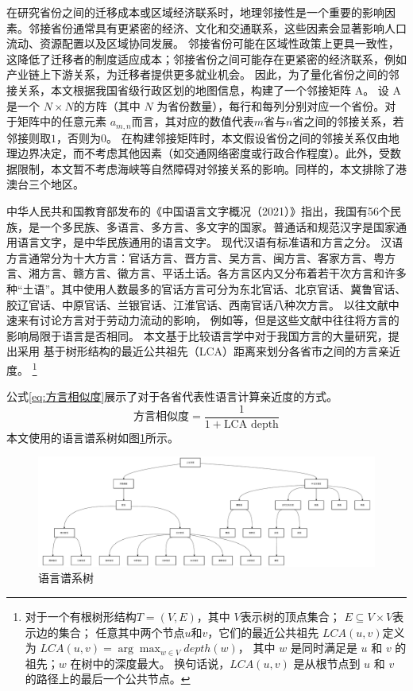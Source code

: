\documentclass[
  a4paper,
  zihao=-4,
  fontset=mac,
  AutoFakeBold,
  AutoFakeSlant,
  oneside]{ctexbook}
\let\oldfootnote\footnote
\renewcommand{\footnote}[1]{%
  \oldfootnote{\setstretch{1.5}#1}%
}
\begin{document}
在研究省份之间的迁移成本或区域经济联系时，地理邻接性是一个重要的影响因素。邻接省份通常具有更紧密的经济、文化和交通联系，这些因素会显著影响人口流动、资源配置以及区域协同发展。
邻接省份可能在区域性政策上更具一致性，这降低了迁移者的制度适应成本；邻接省份之间可能存在更紧密的经济联系，例如产业链上下游关系，为迁移者提供更多就业机会。
因此，为了量化省份之间的邻接关系，本文根据我国省级行政区划的地图信息，构建了一个邻接矩阵 A。
设 A 是一个 $N \times N$的方阵（其中 $N$ 为省份数量），每行和每列分别对应一个省份。对于矩阵中的任意元素 $a_{m,n}$而言，其对应的数值代表$m$省与$n$省之间的邻接关系，若邻接则取$1$，否则为$0$。
在构建邻接矩阵时，本文假设省份之间的邻接关系仅由地理边界决定，而不考虑其他因素（如交通网络密度或行政合作程度）。此外，受数据限制，本文暂不考虑海峡等自然障碍对邻接关系的影响。同样的，本文排除了港澳台三个地区。

中华人民共和国教育部发布的《中国语言文字概况（2021）》指出，我国有56个民族，是一个多民族、多语言、多方言、多文字的国家。普通话和规范汉字是国家通用语言文字，是中华民族通用的语言文字。
现代汉语有标准语和方言之分。
汉语方言通常分为十大方言：官话方言、晋方言、吴方言、闽方言、客家方言、粤方言、湘方言、赣方言、徽方言、平话土话。各方言区内又分布着若干次方言和许多种“土语”。其中使用人数最多的官话方言可分为东北官话、北京官话、冀鲁官话、胶辽官话、中原官话、兰银官话、江淮官话、西南官话八种次方言。
以往文献中速来有讨论方言对于劳动力流动的影响，
例如\textcite{HuangZongYeFangYanDuiShengJiRenKouQianYiDeYingXiang2020,LiQinFangYanPuTongHuaYuZhongGuoLaoDongLiQuYuLiuDong2014}等，但是这些文献中往往将方言的影响局限于语言是否相同。
本文基于比较语言学中对于我国方言的大量研究，提出采用
基于树形结构的最近公共祖先（LCA）距离来划分各省市之间的方言亲近度。
\footnote{
对于一个有根树形结构$T=(V,E)$，其中
$V$表示树的顶点集合；
$E\subseteq V \times V$表示边的集合；
任意其中两个节点$u$和$v$，它们的最近公共祖先 $LCA(u,v) $定义为
$LCA(u,v)=\arg \max_{w\in V} depth(w)$，
其中 $w$ 是同时满足是 $u$ 和 $v$ 的祖先；$w$ 在树中的深度最大。
换句话说，$LCA(u,v)$ 是从根节点到 $u$ 和 $v$ 的路径上的最后一个公共节点。
}
公式\ref{eq:方言相似度}展示了对于各省代表性语言计算亲近度的方式。
\begin{equation}
  \label{eq:方言相似度}
  \text{方言相似度}=\frac{1}{1+\text{LCA depth}}
\end{equation}
本文使用的语言谱系树如图\ref{fig:linguistic_tree}所示。
\begin{figure}[!ht]
\centering
\caption{语言谱系树}
\label{fig:linguistic_tree}
\includegraphics[width=\textwidth]{images/linguisitc_tree.drawio.pdf}
\end{figure}
\end{document}
